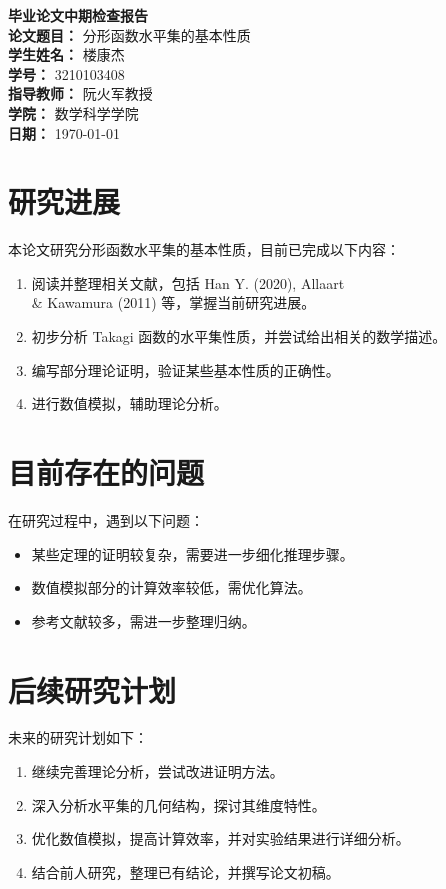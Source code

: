 \documentclass[12pt,a4paper]{article}
\begin{document}
\begin{center}
    \vspace*{2cm}
    \textbf{\LARGE 毕业论文中期检查报告}\\[1.5cm]
    \textbf{论文题目：} 分形函数水平集的基本性质\\[0.5cm]
    \textbf{学生姓名：} 楼康杰\\[0.5cm]
    \textbf{学号：} 3210103408\\[0.5cm]
    \textbf{指导教师：} 阮火军教授\\[0.5cm]
    \textbf{学院：} 数学科学学院\\[0.5cm]
    \textbf{日期：} \today
\end{center}
\newpage

\section{研究进展}
本论文研究分形函数水平集的基本性质，目前已完成以下内容：
\begin{enumerate}
    \item 阅读并整理相关文献，包括 Han Y. (2020), Allaart \\& Kawamura (2011) 等，掌握当前研究进展。
    \item 初步分析 Takagi 函数的水平集性质，并尝试给出相关的数学描述。
    \item 编写部分理论证明，验证某些基本性质的正确性。
    \item 进行数值模拟，辅助理论分析。
\end{enumerate}

\section{目前存在的问题}
在研究过程中，遇到以下问题：
\begin{itemize}
    \item 某些定理的证明较复杂，需要进一步细化推理步骤。
    \item 数值模拟部分的计算效率较低，需优化算法。
    \item 参考文献较多，需进一步整理归纳。
\end{itemize}

\section{后续研究计划}
未来的研究计划如下：
\begin{enumerate}
    \item 继续完善理论分析，尝试改进证明方法。
    \item 深入分析水平集的几何结构，探讨其维度特性。
    \item 优化数值模拟，提高计算效率，并对实验结果进行详细分析。
    \item 结合前人研究，整理已有结论，并撰写论文初稿。
\end{enumerate}
\end{document}
